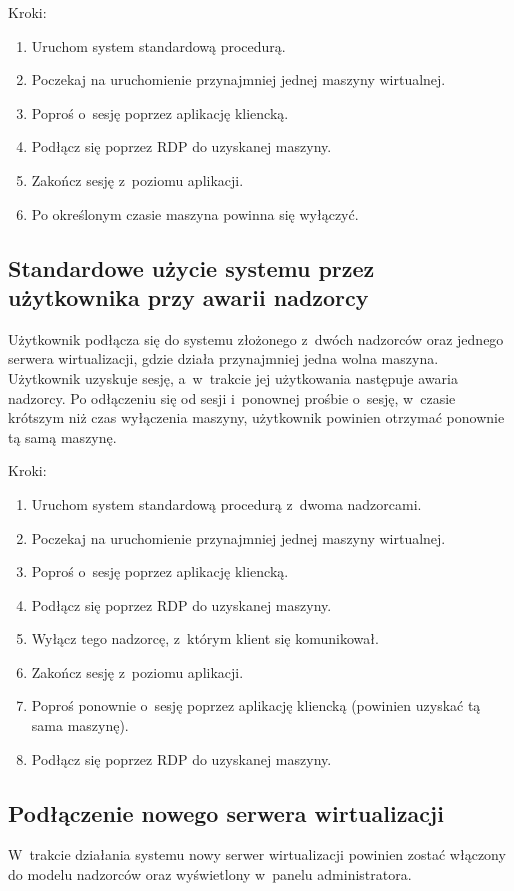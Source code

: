 \documentclass[../analiza-rozwiazania.tex]{subfiles}
\begin{document}
Kroki:
\begin{enumerate}
  \item Uruchom system standardową procedurą.
  \item Poczekaj na uruchomienie przynajmniej jednej maszyny wirtualnej.
  \item Poproś o~sesję poprzez aplikację kliencką.
  \item Podłącz się poprzez RDP do uzyskanej maszyny.
  \item Zakończ sesję z~poziomu aplikacji.
  \item Po określonym czasie maszyna powinna się wyłączyć.
\end{enumerate}

\subsection{Standardowe użycie systemu przez użytkownika przy awarii nadzorcy}
Użytkownik podłącza się do systemu złożonego z~dwóch nadzorców oraz jednego serwera wirtualizacji, gdzie działa przynajmniej jedna wolna maszyna.
Użytkownik uzyskuje sesję, a~w~trakcie jej użytkowania następuje awaria nadzorcy.
Po odłączeniu się od sesji i~ponownej prośbie o~sesję, w~czasie krótszym niż czas wyłączenia maszyny, użytkownik powinien otrzymać ponownie tą samą maszynę.

Kroki:
\begin{enumerate}
  \item Uruchom system standardową procedurą z~dwoma nadzorcami.
  \item Poczekaj na uruchomienie przynajmniej jednej maszyny wirtualnej.
  \item Poproś o~sesję poprzez aplikację kliencką.
  \item Podłącz się poprzez RDP do uzyskanej maszyny.
  \item Wyłącz tego nadzorcę, z~którym klient się komunikował.
  \item Zakończ sesję z~poziomu aplikacji.
  \item Poproś ponownie o~sesję poprzez aplikację kliencką (powinien uzyskać tą sama maszynę).
  \item Podłącz się poprzez RDP do uzyskanej maszyny.
\end{enumerate}

\subsection{Podłączenie nowego serwera wirtualizacji}
W~trakcie działania systemu nowy serwer wirtualizacji powinien zostać włączony do modelu nadzorców oraz wyświetlony w~panelu administratora.
\end{document}
